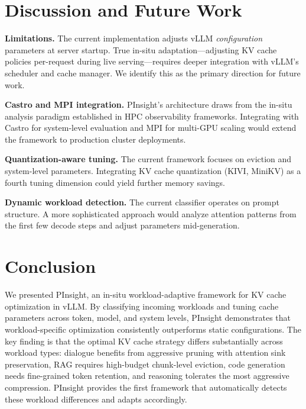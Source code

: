 \documentclass[conference]{IEEEtran}
\begin{document}
\section{Discussion and Future Work}

\textbf{Limitations.} The current implementation adjusts vLLM \textit{configuration} parameters at server startup. True in-situ adaptation---adjusting KV cache policies per-request during live serving---requires deeper integration with vLLM's scheduler and cache manager. We identify this as the primary direction for future work.

\textbf{Castro and MPI integration.} PInsight's architecture draws from the in-situ analysis paradigm established in HPC observability frameworks. Integrating with Castro for system-level evaluation and MPI for multi-GPU scaling would extend the framework to production cluster deployments.

\textbf{Quantization-aware tuning.} The current framework focuses on eviction and system-level parameters. Integrating KV cache quantization (KIVI, MiniKV) as a fourth tuning dimension could yield further memory savings.

\textbf{Dynamic workload detection.} The current classifier operates on prompt structure. A more sophisticated approach would analyze attention patterns from the first few decode steps and adjust parameters mid-generation.

\section{Conclusion}

We presented PInsight, an in-situ workload-adaptive framework for KV cache optimization in vLLM. By classifying incoming workloads and tuning cache parameters across token, model, and system levels, PInsight demonstrates that workload-specific optimization consistently outperforms static configurations. The key finding is that the optimal KV cache strategy differs substantially across workload types: dialogue benefits from aggressive pruning with attention sink preservation, RAG requires high-budget chunk-level eviction, code generation needs fine-grained token retention, and reasoning tolerates the most aggressive compression. PInsight provides the first framework that automatically detects these workload differences and adapts accordingly.
\end{document}
